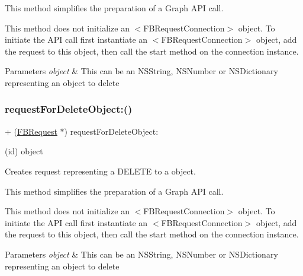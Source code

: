This method simplifies the preparation of a Graph A\+PI call.

This method does not initialize an $<$\+F\+B\+Request\+Connection$>$ object. To initiate the A\+PI call first instantiate an $<$\+F\+B\+Request\+Connection$>$ object, add the request to this object, then call the {\ttfamily start} method on the connection instance.


\begin{DoxyParams}{Parameters}
{\em object} & This can be an N\+S\+String, N\+S\+Number or N\+S\+Dictionary representing an object to delete \\
\hline
\end{DoxyParams}
\mbox{\label{interfaceFBRequest_a6d457b796765de6b436e5ff6cf11cc44}} 
\subsubsection{\texorpdfstring{request\+For\+Delete\+Object\+:()}{requestForDeleteObject:()}\hspace{0.1cm}{\footnotesize\ttfamily [4/5]}}
{\footnotesize\ttfamily + (\hyperlink{interfaceFBRequest}{F\+B\+Request} $\ast$) request\+For\+Delete\+Object\+: \begin{DoxyParamCaption}\item[{(id)}]{object }\end{DoxyParamCaption}}

Creates request representing a D\+E\+L\+E\+TE to a object.

This method simplifies the preparation of a Graph A\+PI call.

This method does not initialize an $<$\+F\+B\+Request\+Connection$>$ object. To initiate the A\+PI call first instantiate an $<$\+F\+B\+Request\+Connection$>$ object, add the request to this object, then call the {\ttfamily start} method on the connection instance.


\begin{DoxyParams}{Parameters}
{\em object} & This can be an N\+S\+String, N\+S\+Number or N\+S\+Dictionary representing an object to delete \\
\hline
\end{DoxyParams}
\mbox{\label{interfaceFBRequest_a6d457b796765de6b436e5ff6cf11cc44}} 
